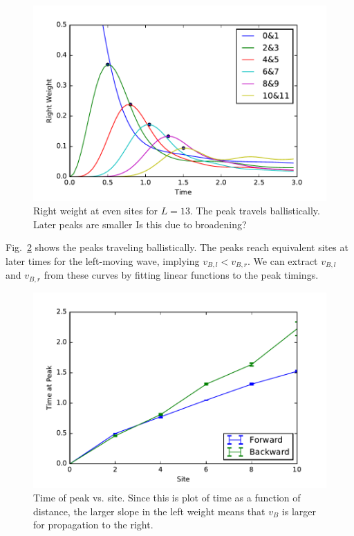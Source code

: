\documentclass[aps,prx,reprint,superscriptaddress, longbibliography]{revtex4-1}
\newcommand{\charlie}[1]{ {\color{Magenta} {{#1}}}}
\begin{document}
\begin{figure}
	\includegraphics[width=\columnwidth]{Rweightpeakshape}
	\caption{Right weight at even sites for $L=13$. The peak travels ballistically. Later peaks are smaller \charlie{Is this due to broadening?}}
	\label{fig:Rweightpeakshape}
\end{figure}

Fig.~\ref{fig:Rweightpeaktimes} shows the peaks traveling ballistically. The peaks reach equivalent sites at later times for the left-moving wave, implying $v_{B,l}<v_{B,r}$. We can extract $v_{B,l}$ and $v_{B,r}$ from these curves by fitting linear functions to the peak timings.

\begin{figure}
	\includegraphics[width=\columnwidth]{Rweightpeaktimes}
	\caption{Time of peak vs. site. Since this is plot of time as a function of distance, the larger slope in the left weight means that $v_B$ is larger for propagation to the right. }
	\label{fig:Rweightpeaktimes}
\end{figure}
\end{document}
